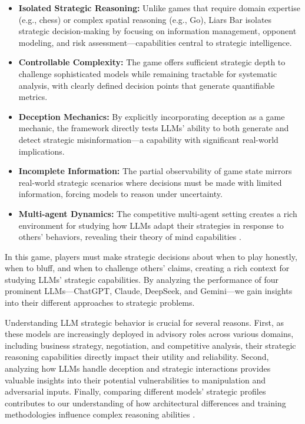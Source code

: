 \documentclass{article}
\begin{document}
\begin{itemize}
    \item \textbf{Isolated Strategic Reasoning:} Unlike games that require domain expertise (e.g., chess) or complex spatial reasoning (e.g., Go), Liars Bar isolates strategic decision-making by focusing on information management, opponent modeling, and risk assessment—capabilities central to strategic intelligence.
    
    \item \textbf{Controllable Complexity:} The game offers sufficient strategic depth to challenge sophisticated models while remaining tractable for systematic analysis, with clearly defined decision points that generate quantifiable metrics.
    
    \item \textbf{Deception Mechanics:} By explicitly incorporating deception as a game mechanic, the framework directly tests LLMs' ability to both generate and detect strategic misinformation—a capability with significant real-world implications.
    
    \item \textbf{Incomplete Information:} The partial observability of game state mirrors real-world strategic scenarios where decisions must be made with limited information, forcing models to reason under uncertainty.
    
    \item \textbf{Multi-agent Dynamics:} The competitive multi-agent setting creates a rich environment for studying how LLMs adapt their strategies in response to others' behaviors, revealing their theory of mind capabilities \cite{ullman2023large}.
\end{itemize}

In this game, players must make strategic decisions about when to play honestly, when to bluff, and when to challenge others' claims, creating a rich context for studying LLMs' strategic capabilities. By analyzing the performance of four prominent LLMs—ChatGPT, Claude, DeepSeek, and Gemini—we gain insights into their different approaches to strategic problems.

Understanding LLM strategic behavior is crucial for several reasons. First, as these models are increasingly deployed in advisory roles across various domains, including business strategy, negotiation, and competitive analysis, their strategic reasoning capabilities directly impact their utility and reliability. Second, analyzing how LLMs handle deception and strategic interactions provides valuable insights into their potential vulnerabilities to manipulation and adversarial inputs. Finally, comparing different models' strategic profiles contributes to our understanding of how architectural differences and training methodologies influence complex reasoning abilities \cite{yang2024rewards}.
\end{document}
